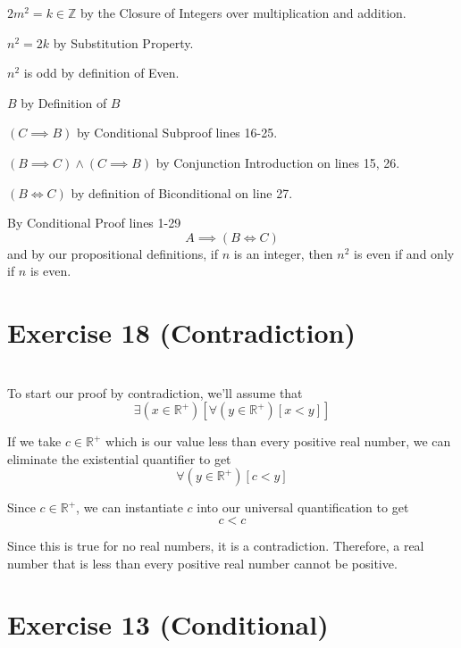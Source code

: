 \documentclass[11pt]{article}
\begin{document}
\begin{enumerate}
\begin{framed}
\begin{framed}
            \item $2m^2 = k \in \mathbb{Z}$ by the Closure of Integers over multiplication and addition.
            \item $n^2 = 2k$ by Substitution Property.
            \item $n^2$ is odd by definition of Even.
            \item $B$ by Definition of $B$
        \end{framed}
        \item $(C \implies B)$ by Conditional Subproof lines 16-25.
        \item $(B \implies C) \land (C \implies B)$ by Conjunction Introduction on lines 15, 26.
        \item $(B \iff C)$ by definition of Biconditional on line 27.
    \end{framed}
\end{enumerate}

By Conditional Proof lines 1-29
\[A \implies (B \iff C)\]
and by our propositional definitions, if $n$ is an integer, then $n^2$ is even if and only if $n$ is even.

\newpage
\section*{Exercise 18 (Contradiction)}
\\

To start our proof by contradiction, we'll assume that
\[\exists (x \in \mathbb{R}^+)[\forall (y \in \mathbb{R}^+)[x < y]]\]

If we take $c \in \mathbb{R}^+$ which is our value less than every positive real number, we can eliminate the existential quantifier to get
\[\forall (y \in \mathbb{R}^+)[c < y]\]

Since $c \in \mathbb{R}^+$, we can instantiate $c$ into our universal quantification to get
\[c < c\]

Since this is true for no real numbers, it is a contradiction. Therefore, a real number that is less than every positive real number cannot be positive.


\section*{Exercise 13 (Conditional)}
\\
\end{document}
